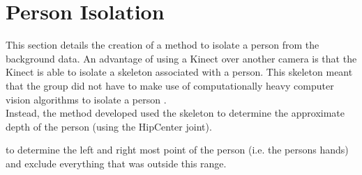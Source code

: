 \section{Person Isolation}
\label{person isolation}
This section details the creation of a method to isolate a person from the background data. An advantage of using a Kinect over another camera is that the Kinect is able to isolate a skeleton associated with a person. This skeleton meant that the group did not have to make use of computationally heavy computer vision algorithms to isolate a person .\\

Instead, the method developed used the skeleton to determine the approximate depth of the person (using the HipCenter joint).

to determine the left and right most point of the person (i.e. the persons hands) and exclude everything that was outside this range.